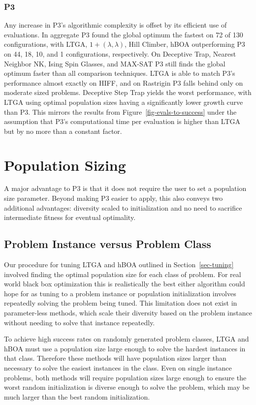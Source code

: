 \documentclass[twoside]{article}
\begin{document}
\subsubsection{P3}
Any increase in P3's algorithmic complexity is offset by its efficient use of evaluations.
In aggregate P3 found the global optimum the fastest on 72 of 130 configurations,
with LTGA, $1+(\lambda, \lambda)$, Hill Climber, hBOA outperforming P3 on 44, 18, 10, and 1 configurations, respectively.
On
Deceptive Trap, Nearest Neighbor NK, Ising Spin Glasses, and MAX-SAT P3 still finds the global
optimum faster than all comparison techniques. LTGA is able to match P3's performance almost exactly on HIFF,
and on Rastrigin P3 falls behind only on moderate sized problems. Deceptive Step Trap yields the worst performance,
with LTGA using optimal population sizes having a significantly lower growth curve than P3. This mirrors
the results from Figure~\ref{fig-evals-to-success} under the assumption that P3's computational time per evaluation is higher
than LTGA but by no more than a constant factor.

\section{Population Sizing}
A major advantage to P3 is that it does not require the user to set a population size parameter.
Beyond making P3 easier to apply, this also conveys two additional advantages: diversity scaled
to initialization and no need to sacrifice intermediate fitness for eventual optimality.

\subsection{Problem Instance versus Problem Class}
Our procedure for tuning LTGA and hBOA outlined in Section~\ref{sec-tuning} involved finding
the optimal population size for each class of problem. For real world black box optimization this is
realistically the best either algorithm could hope for as tuning to a problem
instance or population initialization involves repeatedly solving the problem being tuned.
This limitation does not exist in parameter-less methods, which scale their diversity
based on the problem instance without needing to solve that instance repeatedly.

To achieve high success rates on randomly generated problem classes, LTGA and hBOA must use a population size
large enough to solve the hardest instances in that class. Therefore these methods will have
population sizes larger than necessary to solve the easiest instances in the class. Even
on single instance problems, both methods will require population sizes large enough to
ensure the worst random initialization is diverse enough to solve the problem, which may be
much larger than the best random initialization.
\end{document}
